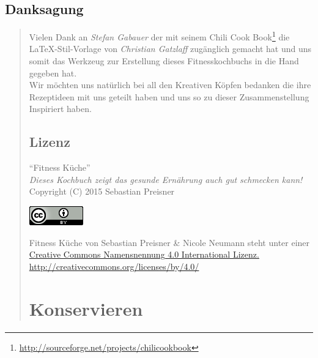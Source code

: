 \documentclass[naustrian]{scrartcl}
\begin{document}
\subsection*{\centering Danksagung}
\begin{quote}
Vielen Dank an \emph{Stefan Gabauer} der mit seinem Chili Cook Book\footnote{\url{http://sourceforge.net/projects/chilicookbook}} die \LaTeX-Stil-Vorlage von \emph{Christian Gatzlaff} zugänglich gemacht hat und uns somit das Werkzeug zur Erstellung dieses Fitnesskochbuchs in die Hand gegeben hat.\\

Wir möchten uns natürlich bei all den Kreativen Köpfen bedanken die ihre Rezeptideen mit uns geteilt haben und uns so zu dieser Zusammenstellung Inspiriert haben.
\vspace{2cm}

\subsection*{\centering Lizenz}
\begin{center}
"`Fitness Küche"'\\
\textit{Dieses Kochbuch zeigt das gesunde Ernährung auch gut schmecken kann!}\\
Copyright (C) 2015 Sebastian Preisner\\

\begin{center}
	\href{http://creativecommons.org/licenses/by-nc-sa/3.0/de/}{\includegraphics{cclogo.png}}
\end{center}

Fitness Küche von Sebastian Preisner & Nicole Neumann steht unter einer \\\href{http://creativecommons.org/licenses/by/4.0/}{Creative Commons Namensnennung 4.0 International Lizenz.}\\
\url{http://creativecommons.org/licenses/by/4.0/}
\end{center}


\section{Konservieren} %


\end{quote}
\end{document}
